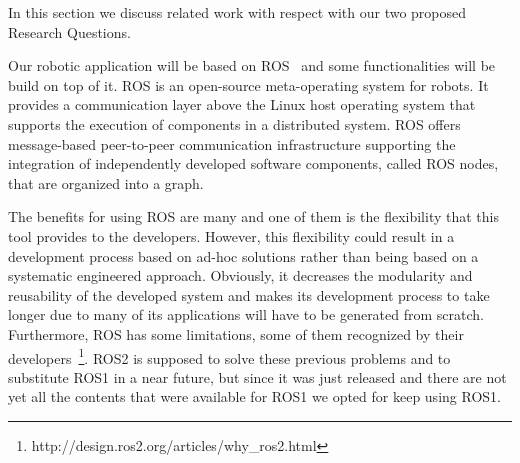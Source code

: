 In this section we discuss related work with respect with our two proposed Research Questions.

Our robotic application will be based on ROS~\cite{Quigley2009} and some functionalities will be build on top of it. 
ROS is an open-source meta-operating system for robots. 
It provides a communication layer above the Linux host operating system that supports the execution of components in a distributed system. 
ROS offers message-based peer-to-peer communication infrastructure supporting the integration of independently developed software components, called ROS nodes, that are organized into a graph.

The benefits for using ROS are many and one of them is the flexibility that this tool provides to the developers.
However, this flexibility could result in a development process based on ad-hoc solutions rather than being based on a systematic engineered approach. 
Obviously, it decreases the modularity and reusability of the developed system and makes its development process to take longer due to many of its applications will have to be generated from scratch. 
Furthermore, ROS has some limitations, some of them recognized by their developers~\footnote{http://design.ros2.org/articles/why\_ros2.html}.
ROS2 is supposed to solve these previous problems and to substitute ROS1 in a near future, but since it was just released and there are not yet all the contents that were available for ROS1 we opted for keep using ROS1.

